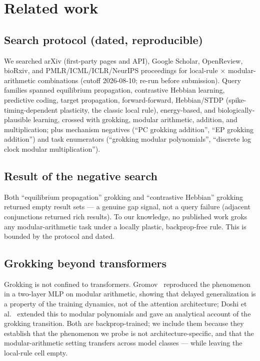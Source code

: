 \documentclass[11pt]{article}
\begin{document}
\section{Related work}\label{sec:related}
\subsection{Search protocol (dated, reproducible)}\label{sec:protocol}
We searched arXiv (first-party pages and API), Google Scholar, OpenReview, bioRxiv, and PMLR\slash ICML\slash ICLR\slash NeurIPS proceedings for local-rule $\times$ modular-arithmetic combinations (cutoff 2026-08-10; re-run before submission). Query families spanned equilibrium propagation, contrastive Hebbian learning, predictive coding, target propagation, forward-forward, Hebbian/STDP (spike-timing-dependent plasticity, the classic local rule), energy-based, and biologically-plausible learning, crossed with grokking, modular arithmetic, addition, and multiplication; plus mechanism negatives (``PC grokking addition'', ``EP grokking addition'') and task enumerators (``grokking modular polynomials'', ``discrete log clock modular multiplication'').

\subsection{Result of the negative search}\label{sec:negative}
Both ``equilibrium propagation'' grokking and ``contrastive Hebbian'' grokking returned empty result sets --- a genuine gap signal, not a query failure (adjacent conjunctions returned rich results). To our knowledge, no published work groks any modular-arithmetic task under a locally plastic, backprop-free rule. This is bounded by the protocol and dated.

\subsection{Grokking beyond transformers}\label{sec:grokking-beyond}
Grokking is not confined to transformers. Gromov~\cite{gromov2023} reproduced the phenomenon in a two-layer MLP on modular arithmetic, showing that delayed generalization is a property of the training dynamics, not of the attention architecture; Doshi et al.~\cite{doshi2024} extended this to modular polynomials and gave an analytical account of the grokking transition. Both are backprop-trained; we include them because they establish that the phenomenon we probe is not architecture-specific, and that the modular-arithmetic setting transfers across model classes --- while leaving the local-rule cell empty.
\end{document}
